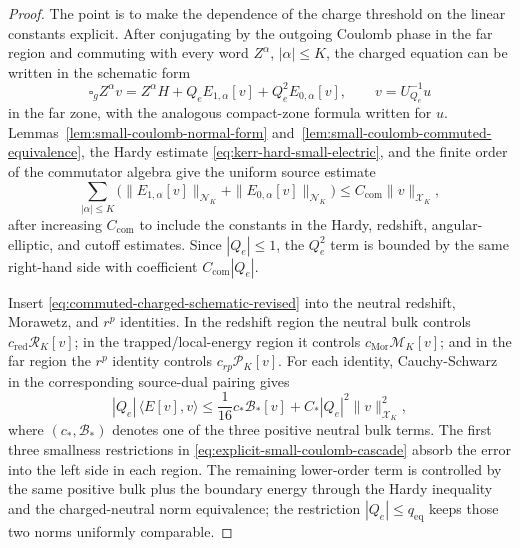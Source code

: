 \documentclass[11pt]{article}
\numberwithin{equation}{section}
\theoremstyle{plain}
\theoremstyle{definition}
\theoremstyle{remark}
\begin{document}
\begin{proof}

The point is to make the dependence of the charge threshold on the linear constants explicit.  After conjugating by the outgoing Coulomb phase in the far region and commuting with every word \(Z^\alpha\), \(|\alpha|\le K\), the charged equation can be written in the schematic form
\begin{equation}\label{eq:commuted-charged-schematic-revised}
 \square_g Z^\alpha v=Z^\alpha H+Q_e E_{1,\alpha}[v]+Q_e^2E_{0,\alpha}[v],
 \qquad v=U_{Q_e}^{-1}u
\end{equation}
in the far zone, with the analogous compact-zone formula written for \(u\).  Lemmas~\ref{lem:small-coulomb-normal-form} and~\ref{lem:small-coulomb-commuted-equivalence}, the Hardy estimate \eqref{eq:kerr-hard-small-electric}, and the finite order of the commutator algebra give the uniform source estimate
\begin{equation}\label{eq:commutator-source-smallness-revised}
 \sum_{|\alpha|\le K}\bigl(\|E_{1,\alpha}[v]\|_{\mathcal N_K}+\|E_{0,\alpha}[v]\|_{\mathcal N_K}\bigr)
 \le C_{\mathrm{com}}\|v\|_{\mathcal X_K},
\end{equation}
after increasing \(C_{\mathrm{com}}\) to include the constants in the Hardy, redshift, angular-elliptic, and cutoff estimates.  Since \(|Q_e|\le1\), the \(Q_e^2\) term is bounded by the same right-hand side with coefficient \(C_{\mathrm{com}}|Q_e|\).

Insert \eqref{eq:commuted-charged-schematic-revised} into the neutral redshift, Morawetz, and \(r^p\) identities.  In the redshift region the neutral bulk controls \(c_{\mathrm{red}}\mathcal R_K[v]\); in the trapped/local-energy region it controls \(c_{\mathrm{Mor}}\mathcal M_K[v]\); and in the far region the \(r^p\) identity controls \(c_{rp}\mathcal P_K[v]\).  For each identity, Cauchy-Schwarz in the corresponding source-dual pairing gives
\[
 |Q_e|\,\langle E[v],v\rangle
 \le \frac1{16}c_*\mathcal B_*[v]+C_*|Q_e|^2\|v\|_{\mathcal X_K}^2,
\]
where \((c_*,\mathcal B_*)\) denotes one of the three positive neutral bulk terms.  The first three smallness restrictions in \eqref{eq:explicit-small-coulomb-cascade} absorb the error into the left side in each region.  The remaining lower-order term is controlled by the same positive bulk plus the boundary energy through the Hardy inequality and the charged-neutral norm equivalence; the restriction \(|Q_e|\le q_{\mathrm{eq}}\) keeps those two norms uniformly comparable.


\end{proof}
\end{document}
